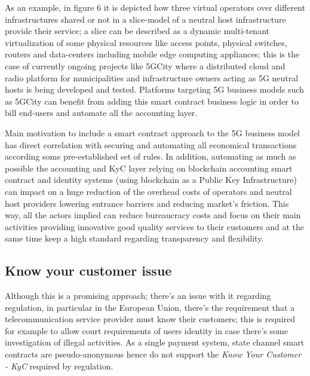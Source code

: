 \documentclass[12pt]{amsart}
\begin{document}
\begin{multicols}{2}

As an example, in figure 6 it is depicted how three virtual operators over
different infrastructures shared or not in a slice-model of a neutral host
infrastructure provide their service;
a slice can be described as a dynamic multi-tenant virtualization
of some physical resources like access points,
physical switches, routers and data-centers including mobile edge computing
appliances; this is the case of currently ongoing projects like
5GCity\cite{5gcity} where a distributed cloud
and radio platform for municipalities and infrastructure owners acting
as 5G neutral hosts is being developed and tested. Platforms
targeting 5G business models such as 5GCity can benefit from adding
this smart contract business logic in order to bill end-users and automate
all the accounting layer.

\vspace{0.35cm}

Main motivation to include a smart contract approach to the 5G
business model has direct correlation with securing and
automating all economical transactions according some pre-established
set of rules. In addition, automating as much as possible the
accounting and KyC layer relying on blockchain accounting smart
contract and identity systems (using blockchain as a Public Key
Infrastructure) can impact on a huge reduction of the overhead costs
of operators and neutral host providers lowering entrance barriers and
reducing market's friction.  This way, all the actors implied can
reduce bureaucracy costs and focus on their main activities providing
innovative good quality services to their customers and at the same
time keep a high standard regarding transparency and flexibility.

\subsection{Know your customer issue}

\vspace{0.35cm}

Although this is a promising approach; there's an issue with it regarding
regulation, in particular in the European Union, there's the requirement
that a telecommunication service provider must know their customers; this
is required for example to allow court requirements of users identity
in case there's some investigation of illegal activities. As a single payment
system, state channel smart contracts are pseudo-anonymous hence do not
support the \textit{Know Your Customer - KyC} required by regulation.


\end{multicols}
\end{document}
